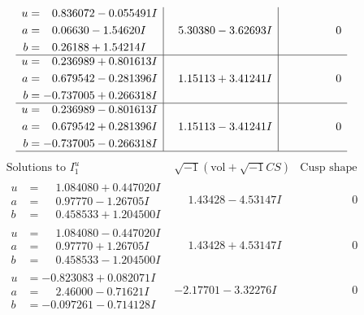 \documentclass[1p]{elsarticle_modified}
\theoremstyle{definition}
\newcommand{\I}{\sqrt{-1}}
\begin{document}
$$\begin{array}{c|c|c}
\begin{aligned}
u &= \phantom{-}0.836072 - 0.055491 I \\
a &= \phantom{-}0.06630 - 1.54620 I \\
b &= \phantom{-}0.26188 + 1.54214 I\end{aligned}
 & \phantom{-}5.30380 - 3.62693 I & \phantom{-0.000000 } 0 \\ \hline\begin{aligned}
u &= \phantom{-}0.236989 + 0.801613 I \\
a &= \phantom{-}0.679542 - 0.281396 I \\
b &= -0.737005 + 0.266318 I\end{aligned}
 & \phantom{-}1.15113 + 3.41241 I & \phantom{-0.000000 } 0 \\ \hline\begin{aligned}
u &= \phantom{-}0.236989 - 0.801613 I \\
a &= \phantom{-}0.679542 + 0.281396 I \\
b &= -0.737005 - 0.266318 I\end{aligned}
 & \phantom{-}1.15113 - 3.41241 I & \phantom{-0.000000 } 0\\
 \hline 
 \end{array}$$\newpage$$\begin{array}{c|c|c}  
\text{Solutions to }I^u_{1}& \I (\text{vol} + \sqrt{-1}CS) & \text{Cusp shape}\\
 \hline 
\begin{aligned}
u &= \phantom{-}1.084080 + 0.447020 I \\
a &= \phantom{-}0.97770 - 1.26705 I \\
b &= \phantom{-}0.458533 + 1.204500 I\end{aligned}
 & \phantom{-}1.43428 - 4.53147 I & \phantom{-0.000000 } 0 \\ \hline\begin{aligned}
u &= \phantom{-}1.084080 - 0.447020 I \\
a &= \phantom{-}0.97770 + 1.26705 I \\
b &= \phantom{-}0.458533 - 1.204500 I\end{aligned}
 & \phantom{-}1.43428 + 4.53147 I & \phantom{-0.000000 } 0 \\ \hline\begin{aligned}
u &= -0.823083 + 0.082071 I \\
a &= \phantom{-}2.46000 - 0.71621 I \\
b &= -0.097261 - 0.714128 I\end{aligned}
 & -2.17701 - 3.32276 I & \phantom{-0.000000 } 0 \\ \hline\begin{aligned}

\end{aligned}
\end{array}$$
\end{document}
